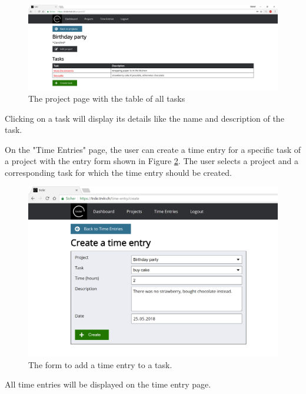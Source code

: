\documentclass[bibliography=totoc, listof=totocnumbered]{scrartcl}
\begin{document}
\begin{figure}[h]
    \includegraphics[width=\textwidth]{trckr-project-page}
    \caption{The project page with the table of all tasks}
    \label{fig:trckr-project-page}
\end{figure}

Clicking on a task will display its details like the name and description of
the task.

On the "Time Entries" page, the user can create a time entry for a specific task
of a project with the entry form shown in Figure
\ref{fig:trckr-create-time-entry}. The user selects a project and a corresponding
task for which the time entry should be created.

\begin{figure}[h]
    \includegraphics[width=\textwidth]{trckr-create-time-entry}
    \caption{The form to add a time entry to a task.}
    \label{fig:trckr-create-time-entry}
\end{figure}

All time entries will be displayed on the time entry page.
\end{document}
